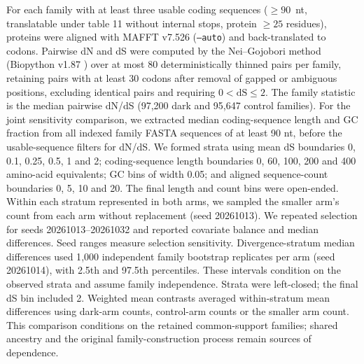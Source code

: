 For each family with at least three usable coding sequences ($\geq 90$~nt, translatable under table
11 without internal stops, protein $\geq 25$ residues), proteins were aligned with MAFFT v7.526
(\texttt{--auto}) \citep{katoh2013mafft} and back-translated to codons. Pairwise dN and dS were computed
by the Nei--Gojobori method \citep{nei1986dnds} (Biopython v1.87 \citep{cock2009biopython}) over at most
80 deterministically thinned pairs per family, retaining pairs with at least 30 codons after removal
of gapped or ambiguous positions, excluding identical pairs and requiring $0 < \mathrm{dS} \leq 2$.
The family statistic is the median pairwise dN/dS (97{,}200 dark and 95{,}647 control families).
For the joint sensitivity comparison, we extracted median coding-sequence length and GC
fraction from all indexed family FASTA sequences of at least 90 nt, before the usable-sequence filters for dN/dS. We formed strata using mean dS boundaries
0, 0.1, 0.25, 0.5, 1 and 2; coding-sequence length boundaries 0, 60, 100, 200 and 400 amino-acid
equivalents; GC bins of width 0.05; and aligned sequence-count boundaries 0, 5, 10 and 20.
The final length and count bins were open-ended. Within each stratum represented in both arms,
we sampled the smaller arm's count from each arm without replacement (seed 20261013).
We repeated selection for seeds 20261013--20261032 and reported covariate balance and median
differences. Seed ranges measure selection sensitivity. Divergence-stratum median differences used 1{,}000 independent family bootstrap replicates per arm (seed 20261014), with 2.5th and 97.5th percentiles. These intervals condition on the observed strata and assume family independence. Strata were left-closed; the final dS bin included 2. Weighted mean contrasts averaged within-stratum mean differences using dark-arm counts, control-arm counts or the smaller arm count. This comparison conditions on the retained common-support families; shared ancestry
and the original family-construction process remain sources of dependence.

